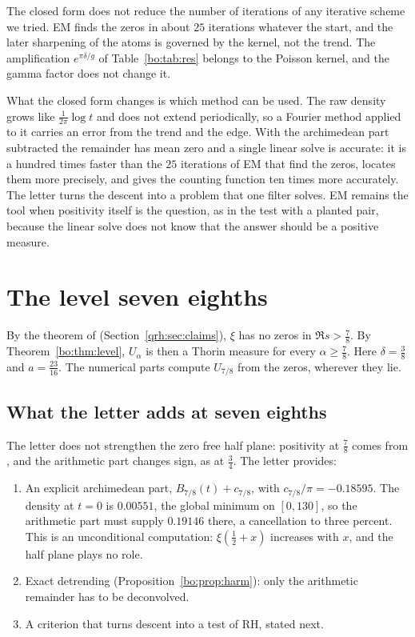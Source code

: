 The closed form does not reduce the number of iterations of any iterative scheme we tried. EM finds the zeros in about $25$ iterations whatever the start, and the later sharpening of the atoms is governed by the kernel, not the trend. The amplification $e^{\pi\delta/g}$ of Table~\ref{bo:tab:res} belongs to the Poisson kernel, and the gamma factor does not change it.

What the closed form changes is which method can be used. The raw density grows like $\frac1{2\pi}\log t$ and does not extend periodically, so a Fourier method applied to it carries an error from the trend and the edge. With the archimedean part subtracted the remainder has mean zero and a single linear solve is accurate: it is a hundred times faster than the $25$ iterations of EM that find the zeros, locates them more precisely, and gives the counting function ten times more accurately. The letter turns the descent into a problem that one filter solves. EM remains the tool when positivity itself is the question, as in the test with a planted pair, because the linear solve does not know that the answer should be a positive measure.

\section{The level seven eighths}

By the theorem of \cite{OAI26a} (Section~\ref{qrh:sec:claims}), $\xi$ has no zeros in $\Re s>\frac78$. By Theorem~\ref{bo:thm:level}, $U_\alpha$ is then a Thorin measure for every $\alpha\ge\frac78$. Here $\delta=\frac38$ and $a=\frac{23}{16}$. The numerical parts compute $U_{7/8}$ from the zeros, wherever they lie.

\subsection{What the letter adds at seven eighths}

The letter does not strengthen the zero free half plane: positivity at $\frac78$ comes from \cite{OAI26a}, and the arithmetic part changes sign, as at $\frac34$. The letter provides:
\begin{enumerate}
\item An explicit archimedean part, $B_{7/8}(t)+c_{7/8}$, with $c_{7/8}/\pi=-0.18595$. The density at $t=0$ is $0.00551$, the global minimum on $[0,130]$, so the arithmetic part must supply $0.19146$ there, a cancellation to three percent. This is an unconditional computation: $\xi(\frac12+x)$ increases with $x$, and the half plane plays no role.
\item Exact detrending (Proposition~\ref{bo:prop:harm}): only the arithmetic remainder has to be deconvolved.
\item A criterion that turns descent into a test of RH, stated next.
\end{enumerate}

